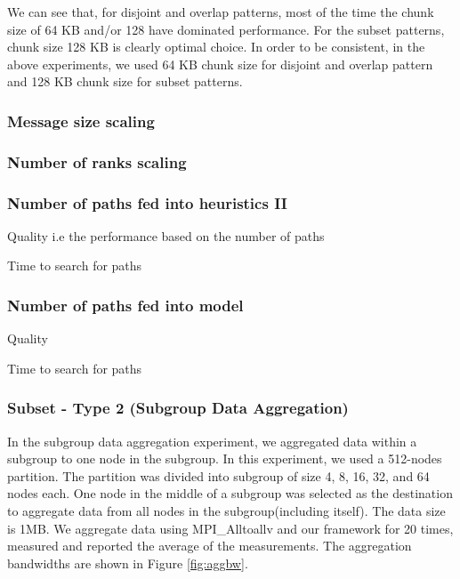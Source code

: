 We can see that, for disjoint and overlap patterns, most of the time the chunk size of 64 KB and/or 128 have dominated performance. For the subset patterns, chunk size 128 KB is clearly optimal choice. In order to be consistent, in the above experiments, we used 64 KB chunk size for disjoint and overlap pattern and 128 KB chunk size for subset patterns.

\subsubsection{Message size scaling}

\subsubsection{Number of ranks scaling}

\subsubsection{Number of paths fed into heuristics II}

Quality i.e the performance based on the number of paths

Time to search for paths

\subsubsection{Number of paths fed into model}

Quality

Time to search for paths

\subsubsection{Subset - Type 2 (Subgroup Data Aggregation)}

In the subgroup data aggregation experiment, we aggregated data within a subgroup to one node in the subgroup. In this experiment, we used a 512-nodes partition. The partition was divided into subgroup of size 4, 8, 16, 32, and 64 nodes each. One node in the middle of a subgroup was selected as the destination to aggregate data from all nodes in the subgroup(including itself). The data size is 1MB. We aggregate data using MPI\_Alltoallv and our framework for 20 times, measured and reported the average of the measurements. The aggregation bandwidths are shown in Figure \ref{fig:aggbw}.

